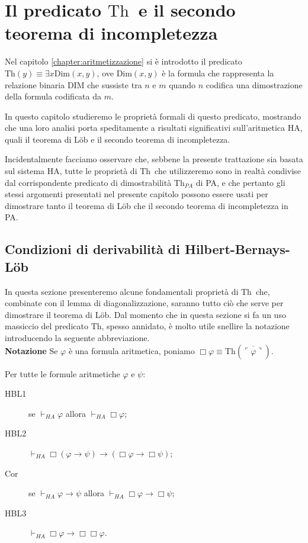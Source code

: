 
\chapter{Il predicato \ensuremath{\mathrm{Th}}\ e il secondo teorema di incompletezza}

\noindent Nel capitolo \ref{chapter:aritmetizzazione} si è introdotto il predicato $\ensuremath{\mathrm{Th}}(y)\equiv\exists x\ensuremath{\mathrm{Dim}}(x,y)$, ove $\ensuremath{\mathrm{Dim}}(x,y)$ è la formula che rappresenta la relazione binaria $\ensuremath{\mathrm{DIM}}$ che sussiste tra $n$ e $m$ quando $n$ codifica una dimostrazione della formula codificata da $m$.

In questo capitolo studieremo le proprietà formali di questo predicato, mostrando che una loro analisi porta speditamente a risultati significativi sull'aritmetica HA, quali il teorema di L\"ob e il secondo teorema di incompletezza.

Incidentalmente facciamo osservare che, sebbene la presente trattazione sia basata sul sistema HA, tutte le proprietà di \ensuremath{\mathrm{Th}}\ che utilizzeremo sono in realtà condivise dal corrispondente predicato di dimostrabilità $\ensuremath{\mathrm{Th}}_{PA}$ di PA, e che pertanto gli stessi argomenti presentati nel presente capitolo possono essere usati per dimostrare tanto il teorema di L\"ob che il secondo teorema di incompletezza in PA.

\section{Condizioni di derivabilità di Hilbert-Bernays-L\"ob}

\noindent In questa sezione presenteremo alcune fondamentali proprietà di \ensuremath{\mathrm{Th}}\ che, combinate con il lemma di diagonalizzazione, saranno tutto ciò che serve per dimostrare il teorema di L\"ob. Dal momento che in questa sezione si fa un uso massiccio del predicato $\ensuremath{\mathrm{Th}}$, spesso annidato, è molto utile snellire la notazione introducendo la seguente abbreviazione.\\

\noindent \textbf{Notazione} Se $\varphi$ è una formula aritmetica, poniamo $\Box\varphi\equiv\ensuremath{\mathrm{Th}}(\overline{\ulcorner\varphi\urcorner})$.

\begin{thm} Per tutte le formule aritmetiche $\varphi$ e $\psi$:
\begin{description}
\item[HBL1] se $\vdash_{HA}\varphi$ allora $\vdash_{HA}\Box\varphi$;
\item[HBL2] $\vdash_{HA}\Box(\varphi\to\psi)\to(\Box\varphi\to\Box\psi)$;
\item[Cor]  se $\vdash_{HA}\varphi\to\psi$ allora $\vdash_{HA}\Box\varphi\to\Box\psi$;
\item[HBL3] $\vdash_{HA}\Box\varphi\to\Box\Box\varphi$.
\end{description}
\end{thm}

